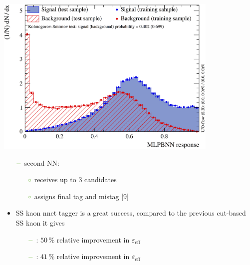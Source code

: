 {\begin{minipage}{0.474\boxwidth}
\begin{itemize}
\begin{center}
\includegraphics[width=0.802\textwidth]{figures/sskaonNnetfirstNN3.png}
\end{center}

\vspace{-2.5em}

\setlength\itemsep{0.01em}
\setlength{\itemindent}{-.11in}
\begin{itemize}
\setlength{\itemindent}{-.11in}
\item[${\color{tu_gruen}-}$] second NN:
\begin{itemize}
\item[${\color{tu_gruen}\circ}$] receives up to 3 candidates 
\item[${\color{tu_gruen}\circ}$] assigns final tag and mistag [9]
\end{itemize}
\end{itemize}
\end{itemize}
\begin{itemize}
\setlength\itemsep{0.01em}
\item SS kaon nnet tagger is a great success, compared \newline to the previous cut-based SS kaon it gives  
\begin{itemize}
\setlength{\itemindent}{-.11in}
\vspace{-0.5em}
\item[${\color{tu_gruen}-}$] \BsToDspi: $50\,\%$ relative improvement in $\varepsilon_{\text{eff}}$
\item[${\color{tu_gruen}-}$] \BsToJPsiPhi: $41\,\%$ relative improvement in $\varepsilon_{\text{eff}}$
\end{itemize}
\end{itemize}
\vspace{-0.1em}
\vspace{-0.75em}
\end{minipage}
}




